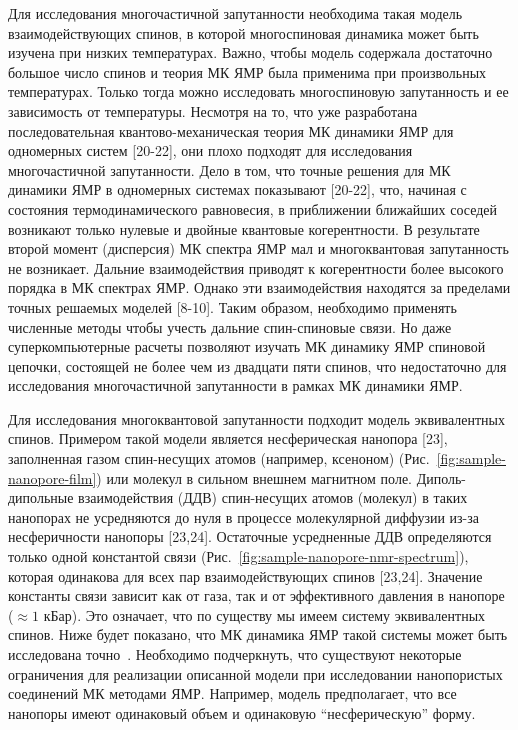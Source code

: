 Для исследования многочастичной запутанности необходима такая модель взаимодействующих спинов,
в которой многоспиновая динамика может быть изучена при низких температурах.
Важно, чтобы модель содержала достаточно большое число спинов
и теория МК ЯМР была применима при произвольных температурах.
Только тогда можно исследовать многоспиновую запутанность и ее зависимость от температуры.
Несмотря на то, что уже разработана последовательная квантово-механическая теория МК динамики ЯМР для одномерных систем [20-22],
они плохо подходят для исследования многочастичной запутанности.
Дело в том, что точные решения для МК динамики ЯМР в одномерных системах показывают [20-22],
что, начиная с состояния термодинамического равновесия,
в приближении ближайших соседей возникают только нулевые и двойные квантовые когерентности.
В результате второй момент (дисперсия) МК спектра ЯМР мал и многоквантовая запутанность не возникает.
Дальние взаимодействия приводят к когерентности более высокого порядка в МК спектрах ЯМР.
Однако эти взаимодействия находятся за пределами точных решаемых моделей [8-10].
Таким образом, необходимо применять численные методы
чтобы учесть дальние спин-спиновые связи.
Но даже суперкомпьютерные расчеты позволяют изучать МК динамику ЯМР спиновой цепочки,
состоящей не более чем из двадцати пяти спинов,
что недостаточно для исследования многочастичной запутанности в рамках МК динамики ЯМР.

Для исследования многоквантовой запутанности подходит модель эквивалентных спинов.
Примером такой модели является  несферическая нанопора [23],
заполненная газом спин-несущих атомов (например, ксеноном) (Рис.~\ref{fig:sample-nanopore-film})
или молекул в сильном внешнем магнитном поле.
Диполь-дипольные взаимодействия (ДДВ) спин-несущих атомов (молекул) в таких нанопорах не усредняются до нуля
в процессе молекулярной диффузии из-за несферичности нанопоры [23,24].
Остаточные усредненные ДДВ определяются только одной константой связи (Рис.~\ref{fig:sample-nanopore-nmr-spectrum}),
которая одинакова для всех пар взаимодействующих спинов [23,24].
Значение константы связи зависит как от газа,
так и от эффективного давления в нанопоре ($\approx 1$ кБар).
Это означает, что по существу мы имеем систему эквивалентных спинов.
Ниже будет показано, что МК динамика ЯМР такой системы может быть исследована точно~\cite{Doronin2009}.
Необходимо подчеркнуть,
что существуют некоторые ограничения для реализации описанной модели
при исследовании нанопористых соединений МК методами ЯМР.
Например, модель предполагает, что все нанопоры имеют одинаковый объем и одинаковую ``несферическую'' форму.


